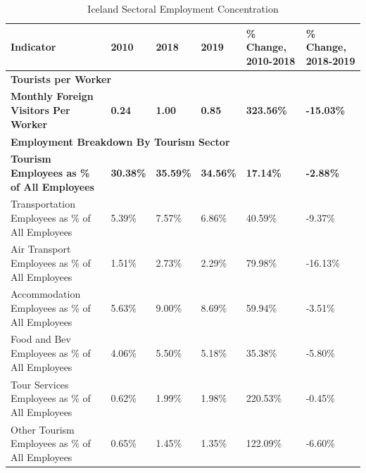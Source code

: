 \begin{table}[!h]
\centering
\caption{\label{tab:tab:specialization}Iceland Sectoral Employment Concentration}
\centering
\begin{tabular}[t]{l|l|l|l|l|l}
\hline
Indicator & 2010 & 2018 & 2019 & \% Change, 2010-2018 & \% Change, 2018-2019\\
\hline
\multicolumn{6}{l}{\textbf{\textbf{Tourists per Worker}}}\\
\hline
\hspace{1em}\textbf{Monthly Foreign Visitors Per Worker} & \textbf{0.24} & \textbf{1.00} & \textbf{0.85} & \textbf{323.56\%} & \textbf{-15.03\%}\\
\hline
\multicolumn{6}{l}{\textbf{\textbf{Employment Breakdown By Tourism Sector}}}\\
\hline
\hspace{1em}\textbf{Tourism Employees as \% of All Employees} & \textbf{30.38\%} & \textbf{35.59\%} & \textbf{34.56\%} & \textbf{17.14\%} & \textbf{-2.88\%}\\
\hline
\hspace{1em}Transportation Employees as \% of All Employees & 5.39\% & 7.57\% & 6.86\% & 40.59\% & -9.37\%\\
\hline
\hspace{1em}Air Transport Employees as \% of All Employees & 1.51\% & 2.73\% & 2.29\% & 79.98\% & -16.13\%\\
\hline
\hspace{1em}Accommodation Employees as \% of All Employees & 5.63\% & 9.00\% & 8.69\% & 59.94\% & -3.51\%\\
\hline
\hspace{1em}Food and Bev Employees as \% of All Employees & 4.06\% & 5.50\% & 5.18\% & 35.38\% & -5.80\%\\
\hline
\hspace{1em}Tour Services Employees as \% of All Employees & 0.62\% & 1.99\% & 1.98\% & 220.53\% & -0.45\%\\
\hline
\hspace{1em}Other Tourism Employees as \% of All Employees & 0.65\% & 1.45\% & 1.35\% & 122.09\% & -6.60\%\\
\hline
\end{tabular}
\end{table}
